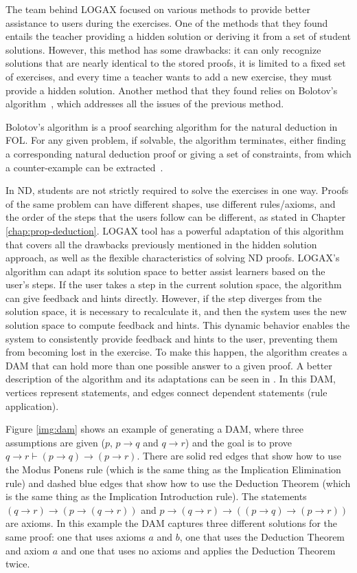 The team behind LOGAX focused on various methods to provide better assistance to users during the exercises. One of the methods that they found entails the teacher providing a hidden solution or deriving it from a set of student solutions. However, this method has some drawbacks: it can only recognize solutions that are nearly identical to the stored proofs, it is limited to a fixed set of exercises, and every time a teacher wants to add a new exercise, they must provide a hidden solution. Another method that they found relies on Bolotov's algorithm~\cite{bolotov_2005_automated}, which addresses all the issues of the previous method.

Bolotov's algorithm is a proof searching algorithm for the natural deduction in \gls{FOL}.
For any given problem, if solvable, the algorithm terminates, either finding a corresponding natural deduction proof or giving a set of constraints, from which a counter-example can be extracted~\cite{bolotov_2005_automated}.

In \gls{ND}, students are not strictly required to solve the exercises in one way. Proofs of the same problem can have different shapes, use different rules/axioms, and the order of the steps that the users follow can be different, as stated in Chapter \ref{chap:prop-deduction}. LOGAX tool has a powerful adaptation of this algorithm that covers all the drawbacks previously mentioned in the hidden solution approach, as well as the flexible characteristics of solving \gls{ND} proofs. LOGAX's algorithm can adapt its solution space to better assist learners based on the user's steps. If the user takes a step in the current solution space, the algorithm can give feedback and hints directly. However, if the step diverges from the solution space, it is necessary to recalculate it, and then the system uses the new solution space to compute feedback and hints. This dynamic behavior enables the system to consistently provide feedback and hints to the user, preventing them from becoming lost in the exercise. To make this happen, the algorithm creates a \gls{DAM} that can hold more than one possible answer to a given proof. A better description of the algorithm and its adaptations can be seen in \cite{lodder_2020_generation, bolotov_2005_automated}. In this \gls{DAM}, vertices represent statements, and edges connect dependent statements (rule application).

Figure \ref{img:dam} shows an example of generating a \gls{DAM}, where three assumptions are given (\(p\), \(p \to q\) and \(q \to r\)) and the goal is to prove \( q \to r \vdash (p \to q) \to (p \to r) \). There are solid red edges that show how to use the Modus Ponens rule (which is the same thing as the Implication Elimination rule) and dashed blue edges that show how to use the Deduction Theorem (which is the same thing as the Implication Introduction rule). The statements \((q \to r) \to (p \to (q \to r)) \) and \( p \to (q \to r) \to ((p \to q) \to (p \to r)) \) are axioms. In this example the \gls{DAM} captures three different solutions for the same proof: one that uses axioms \(a\) and \(b\), one that uses the Deduction Theorem and axiom \(a\) and one that uses no axioms and applies the Deduction Theorem twice.

